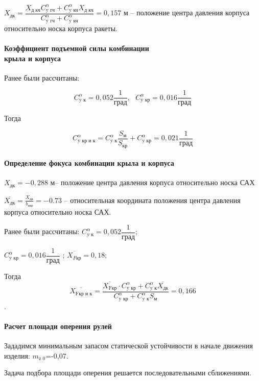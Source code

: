 $X_\text{дк}= \dfrac{X_\text{д кч} C_\text{y гч}^\alpha +C_\text{y кч}^\alpha X_\text{д кч} }{C_\text{y гч}^\alpha + C_\text{y кч}^\alpha } = 0,157$ м – положение центра давления корпуса относительно носка корпуса ракеты.

\clearpage
\paragraph{Коэффициент подъемной силы комбинации \\ крыла и корпуса}

Ранее были рассчитаны: 

$$C_\text{y к}^\alpha=0,052  \frac{1}{ \text{град} }, \text{  }  C_\text{y кр}^\alpha=0,016 \frac{1}{\text{град}} $$

Тогда

$$C_\text{y кр и к}^\alpha = C_\text{y к}^\alpha  \frac{S_\text{м}}{S_\text{кр}} + C_\text{y кр}^\alpha=0,021 \frac{1}{\text{град}}$$

\paragraph{Определение фокуса комбинации крыла и корпуса}

$X_\text{дк}=-0,288$ м– положение центра давления корпуса относительно носка САХ

$\overline{X_\text{дк}}= \frac{X_\text{дк}} {b_\text{акр}} =-0.73$ – относительная координата положения центра давления корпуса относительно носка САХ.

Ранее были рассчитаны: $C_\text{y к}^\alpha=0,052  \dfrac{1}{\text{град}} $;

$C_\text{y кр}^\alpha =0,016 \dfrac{1}{\text{град}}$ ; $\overline{X_{F\text{кр}}}=0,18$;

Тогда	$$\overline{X_\text{Fкр и к}} = \dfrac{\overline{X_\text{Fкр}} \cdot C_\text{y кр}^\alpha +  C_\text{y к}^\alpha \overline{X_\text{дк}} } {C_\text{y кр}^\alpha + C_\text{y к}^\alpha S_\text{м} }=0,166 $$.

\paragraph{Расчет площади оперения рулей}

Зададимся минимальным запасом статической устойчивости в начале движения изделия: $m_\text{z 0}$=-0,07.

Задача подбора площади оперения решается последовательными сближениями.

